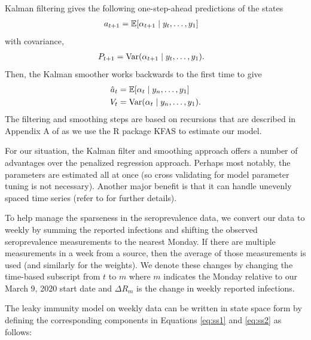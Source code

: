 \documentclass{article}
\begin{document}
Kalman filtering gives the following one-step-ahead predictions of the states
\begin{align*}
a_{t+1} &= \mathbb{E}[\alpha_{t+1}\mid y_t, \dots, y_1] 
\end{align*} with covariance,
\begin{align*}
P_{t+1} &= \operatorname{Var}(\alpha_{t+1} \mid y_t, \dots, y_1).
\end{align*}
Then, the Kalman smoother works backwards to the first time to give
\begin{align}
\hat{a}_t &= \mathbb{E}[\alpha_{t}\mid y_n, \dots, y_1] \label{eq:hatat}\\
V_t &= \operatorname{Var}(\alpha_{t}\mid y_n, \dots, y_1). \label{eq:Vt}
\end{align}
The filtering and smoothing steps are based on recursions that are described in
Appendix A of \citet{helske2017kfas} as we use the R package KFAS to estimate
our model.

For our situation, the Kalman filter and smoothing approach offers a number of
advantages over the penalized regression approach. Perhaps most notably,
 the parameters are estimated all at once (so cross validating for model
parameter tuning is not necessary). Another major benefit is that it can handle 
unevenly spaced time series (refer to \citealp{durbin2012time} for further details).

To help manage the sparseness in the seroprevalence data, we convert our data 
to weekly by summing the reported infections and shifting the observed 
seroprevalence measurements to the nearest Monday. If there are multiple 
measurements in a week from a source, then the average of those 
measurements is used (and similarly for the weights). We denote these changes by 
changing the time-based subscript from $t$ to $m$ where $m$ indicates the Monday 
relative to our March 9, 2020 start date and $\Delta R_m$ is the change in weekly 
reported infections.

The leaky immunity model on weekly data can be written in state space form by 
defining the corresponding components in Equations \ref{eq:ss1} and 
\ref{eq:ss2} as follows:

\end{document}
